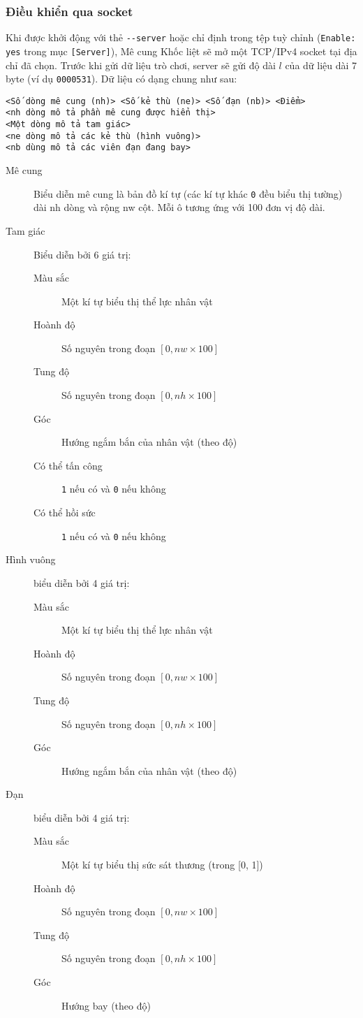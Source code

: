 \documentclass[a4paper,12pt]{article}
\begin{document}
\subsubsection{Điều khiển qua socket}
Khi được khởi động với thẻ \verb|--server| hoặc chỉ định trong tệp tuỳ chỉnh
(\verb|Enable: yes| trong mục \verb|[Server]|), Mê cung Khốc liệt sẽ mở một
TCP/IPv4 socket tại địa chỉ đã chọn. Trước khi gửi dữ liệu trò chơi, server sẽ
gửi độ dài $l$ của dữ liệu dài 7 byte (ví dụ \texttt{0000531}). Dữ liệu có dạng
chung như sau:
\begin{verbatim}
<Số dòng mê cung (nh)> <Số kẻ thù (ne)> <Số đạn (nb)> <Điểm>
<nh dòng mô tả phần mê cung được hiển thị>
<Một dòng mô tả tam giác>
<ne dòng mô tả các kẻ thù (hình vuông)>
<nb dùng mô tả các viên đạn đang bay>
\end{verbatim}
\begin{description}
  \item[Mê cung] Biểu diễn mê cung là bản đồ kí tự (các kí tự khác \verb|0| đều
    biểu thị tường) dài nh dòng và rộng nw cột. Mỗi ô tương ứng với 100 đơn vị
    độ dài.
  \item[Tam giác] Biểu diễn bởi 6 giá trị:
    \begin{description}
      \item[Màu sắc] Một kí tự biểu thị thể lực nhân vật
      \item[Hoành độ] Số nguyên trong đoạn $[0, nw\times 100]$
      \item[Tung độ] Số nguyên trong đoạn $[0, nh\times 100]$
      \item[Góc] Hướng ngắm bắn của nhân vật (theo độ)
      \item[Có thể tấn công] \texttt{1} nếu có và \texttt{0} nếu không
      \item[Có thể hồi sức] \texttt{1} nếu có và \texttt{0} nếu không
    \end{description}
  \item[Hình vuông] biểu diễn bởi 4 giá trị:
    \begin{description}
      \item[Màu sắc] Một kí tự biểu thị thể lực nhân vật
      \item[Hoành độ] Số nguyên trong đoạn $[0, nw\times 100]$
      \item[Tung độ] Số nguyên trong đoạn $[0, nh\times 100]$
      \item[Góc] Hướng ngắm bắn của nhân vật (theo độ)
    \end{description}
  \item[Đạn] biểu diễn bởi 4 giá trị:
    \begin{description}
      \item[Màu sắc] Một kí tự biểu thị sức sát thương (trong [0, 1])
      \item[Hoành độ] Số nguyên trong đoạn $[0, nw\times 100]$
      \item[Tung độ] Số nguyên trong đoạn $[0, nh\times 100]$
      \item[Góc] Hướng bay (theo độ)
    \end{description}
\end{description}
\end{document}
